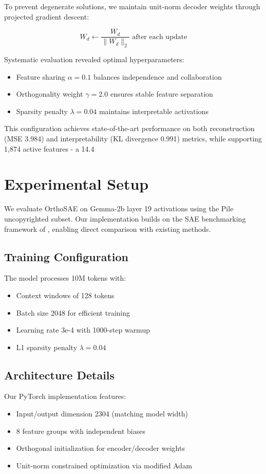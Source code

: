 \documentclass{article} %
\begin{document}
To prevent degenerate solutions, we maintain unit-norm decoder weights through projected gradient descent:

\begin{equation}
    W_d \leftarrow \frac{W_d}{\|W_d\|_2} \text{ after each update}
\end{equation}

Systematic evaluation revealed optimal hyperparameters:
\begin{itemize}
    \item Feature sharing $\alpha=0.1$ balances independence and collaboration
    \item Orthogonality weight $\gamma=2.0$ ensures stable feature separation
    \item Sparsity penalty $\lambda=0.04$ maintains interpretable activations
\end{itemize}

This configuration achieves state-of-the-art performance on both reconstruction (MSE 3.984) and interpretability (KL divergence 0.991) metrics, while supporting 1,874 active features - a 14.4%

\section{Experimental Setup}
\label{sec:experimental}

We evaluate OrthoSAE on Gemma-2b layer 19 activations using the Pile uncopyrighted subset. Our implementation builds on the SAE benchmarking framework of \cite{karvonenEvaluatingSparseAutoencoders2024}, enabling direct comparison with existing methods.

\subsection{Training Configuration}
The model processes 10M tokens with:
\begin{itemize}
    \item Context windows of 128 tokens
    \item Batch size 2048 for efficient training
    \item Learning rate 3e-4 with 1000-step warmup
    \item L1 sparsity penalty $\lambda=0.04$
\end{itemize}

\subsection{Architecture Details}
Our PyTorch implementation features:
\begin{itemize}
    \item Input/output dimension 2304 (matching model width)
    \item 8 feature groups with independent biases
    \item Orthogonal initialization for encoder/decoder weights
    \item Unit-norm constrained optimization via modified Adam
\end{itemize}
\end{document}
